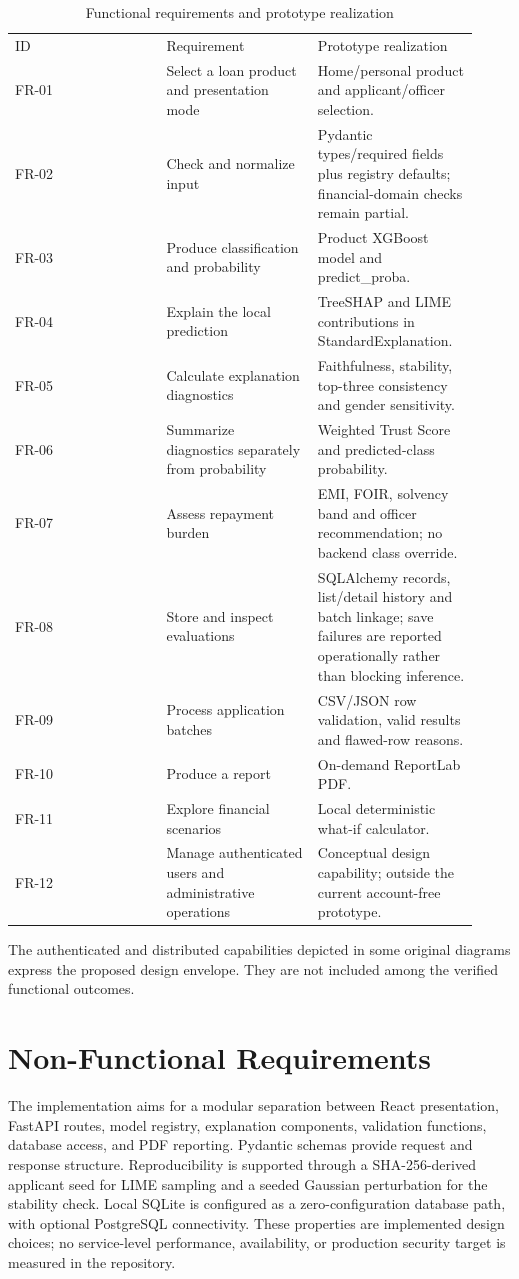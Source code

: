 \documentclass[12pt,a4paper]{report}
\begin{document}
\begin{longtable}{p{0.307\linewidth}p{0.307\linewidth}p{0.307\linewidth}}
\caption{Functional requirements and prototype realization}\\

ID & Requirement & Prototype realization\\
FR-01 & Select a loan product and presentation mode & Home/personal product and applicant/officer selection.\\
FR-02 & Check and normalize input & Pydantic types/required fields plus registry defaults; financial-domain checks remain partial.\\
FR-03 & Produce classification and probability & Product XGBoost model and predict\_proba.\\
FR-04 & Explain the local prediction & TreeSHAP and LIME contributions in StandardExplanation.\\
FR-05 & Calculate explanation diagnostics & Faithfulness, stability, top-three consistency and gender sensitivity.\\
FR-06 & Summarize diagnostics separately from probability & Weighted Trust Score and predicted-class probability.\\
FR-07 & Assess repayment burden & EMI, FOIR, solvency band and officer recommendation; no backend class override.\\
FR-08 & Store and inspect evaluations & SQLAlchemy records, list/detail history and batch linkage; save failures are reported operationally rather than blocking inference.\\
FR-09 & Process application batches & CSV/JSON row validation, valid results and flawed-row reasons.\\
FR-10 & Produce a report & On-demand ReportLab PDF.\\
FR-11 & Explore financial scenarios & Local deterministic what-if calculator.\\
FR-12 & Manage authenticated users and administrative operations & Conceptual design capability; outside the current account-free prototype.\\
\end{longtable}
The authenticated and distributed capabilities depicted in some original diagrams express the proposed design envelope. They are not included among the verified functional outcomes.

\section{Non-Functional Requirements}
The implementation aims for a modular separation between React presentation, FastAPI routes, model registry, explanation components, validation functions, database access, and PDF reporting. Pydantic schemas provide request and response structure. Reproducibility is supported through a SHA-256-derived applicant seed for LIME sampling and a seeded Gaussian perturbation for the stability check. Local SQLite is configured as a zero-configuration database path, with optional PostgreSQL connectivity. These properties are implemented design choices; no service-level performance, availability, or production security target is measured in the repository.
\end{document}

